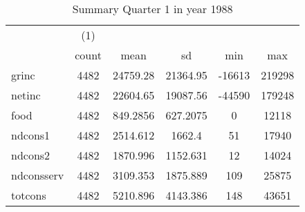 \begin{table}[htbp]\centering
\def\sym#1{\ifmmode^{#1}\else\(^{#1}\)\fi}
\caption{Summary Quarter 1 in year 1988 \label{sum\_Q1\_y1988}}
\begin{tabular}{l*{1}{ccccc}}
\hline\hline
            &\multicolumn{1}{c}{(1)}&            &            &            &            \\
            &       count&        mean&          sd&         min&         max\\
\hline
grinc       &        4482&    24759.28&    21364.95&      -16613&      219298\\
netinc      &        4482&    22604.65&    19087.56&      -44590&      179248\\
food        &        4482&    849.2856&    627.2075&           0&       12118\\
ndcons1     &        4482&    2514.612&      1662.4&          51&       17940\\
ndcons2     &        4482&    1870.996&    1152.631&          12&       14024\\
ndconsserv  &        4482&    3109.353&    1875.889&         109&       25875\\
totcons     &        4482&    5210.896&    4143.386&         148&       43651\\
\hline\hline
\end{tabular}
\end{table}
